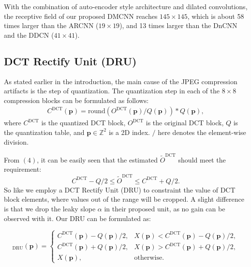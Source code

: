 \documentclass{article}
\begin{document}
With the combination of auto-encoder style architecture and
dilated convolutions, the receptive field of our proposed DMCNN reaches
$145 \times 145$, which is about 58 times larger than the ARCNN
($19 \times 19$), and 13 times larger than the DnCNN and
the DDCN ($41 \times 41$).
\vspace{-0.2cm}

\subsection{DCT Rectify Unit (DRU)}
\label{ssec:dru}

As stated earlier in the introduction, the main cause of the
JPEG compression artifacts is the step of quantization. The quantization step
in each of the $8 \times 8$ compression blocks can be formulated as follows:
\begin{equation}
  \begin{aligned}
    C^\text{DCT}(\mathbf{p}) = \text{round}(O^\text{DCT}(\mathbf{p})
    / Q(\mathbf{p})) * Q(\mathbf{p}),
  \end{aligned}
\end{equation}
where $C^\text{DCT}$ is the quantized DCT block, $O^\text{DCT}$ is
the original DCT block, $Q$ is the quantization table, and
$\mathbf{p} \in \mathbb{Z}^2$ is a 2D index. $/$ here denotes
the element-wise division.

From $(4)$, it can be easily seen that the estimated $\tilde O^\text{DCT}$
should meet the requirement:
\begin{equation}
  C^\text{DCT} - Q/2 \le \tilde O^\text{DCT} \le C^\text{DCT} + Q/2.
\end{equation}
So like \cite{guo2016building} we employ a DCT Rectify Unit (DRU) to constraint
the value of DCT block elements, where values out of the range will be cropped.
A slight difference is that we drop the leaky slope $\alpha$ in their proposed
unit, as no gain can be observed with it. Our DRU can be formulated as:

\footnotesize
\begin{equation}[X]_\text{DRU}(\mathbf{p})=
    \begin{cases}
      C^\text{DCT}(\mathbf{p}) - Q(\mathbf{p}) / 2,
      & X(\mathbf{p})<C^\text{DCT}(\mathbf{p}) - Q(\mathbf{p}) / 2,  \\
      C^\text{DCT}(\mathbf{p}) + Q(\mathbf{p}) / 2, 
      & X(\mathbf{p})>C^\text{DCT}(\mathbf{p}) + Q(\mathbf{p}) / 2,  \\
      X(\mathbf{p}),
      & \text{otherwise}.
    \end{cases}
\end{equation}
\normalsize
\end{document}
